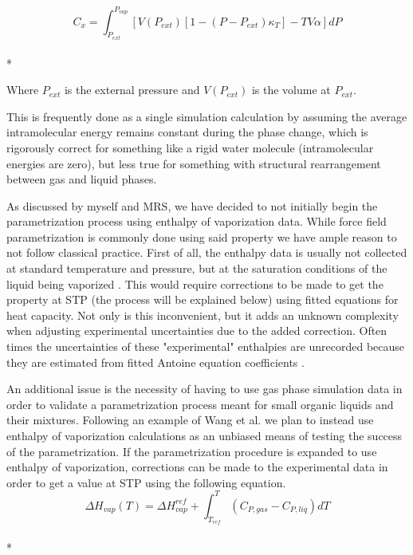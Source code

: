 \documentclass[9pt,bestpractices]{livecoms}
\begin{document}
\begin{equation}C_x = \int_{P_{ext}}^{P_{vap}} \left[V\left(P_{ext}\right)\left[1 - \left(P - P_{ext}\right) \kappa_T\right] - T V \alpha\right] dP\end{equation}\\*

Where $P_{ext}$ is the external pressure and $V\left(P_{ext}\right)$ is the volume at $P_{ext}$. 

This is frequently done as a single simulation calculation by assuming
the average intramolecular energy remains constant during the phase
change, which is rigorously correct for something like a rigid water
molecule (intramolecular energies are zero), but less true for
something with structural rearrangement between gas and liquid phases. 

As discussed by myself and MRS, we have decided to not initially begin the parametrization process using enthalpy of vaporization data. While force field parametrization is commonly done using said property we have ample reason to not follow classical practice. First of all, the enthalpy data is usually not collected at standard temperature and pressure, but at the saturation conditions of the liquid being vaporized \cite{chickos}.  This would require corrections to be made to get the property at STP (the process will be explained below) using fitted equations for heat capacity. Not only is this inconvenient, but it adds an unknown complexity when adjusting experimental uncertainties due to the added correction. Often times the uncertainties of these "experimental" enthalpies are unrecorded because they are estimated from fitted Antoine equation coefficients \cite{chickos}. 

An additional issue is the necessity of having to use gas phase simulation data in order to validate a parametrization process meant for small organic liquids and their mixtures. Following an example of Wang et al. \cite{FF99vdw} we plan to instead use enthalpy of vaporization calculations as an unbiased means of testing the success of the parametrization. If the parametrization procedure is expanded to use enthalpy of vaporization, corrections can be made to the experimental data in order to get a value at STP using the following equation.
\begin{equation}\Delta H_{vap}(T) = \Delta H_{vap}^{ref} + \int_{T_{ref}}^T \left(C_{P, gas} - C_{P, liq}\right) dT \end{equation}\\*
\end{document}
